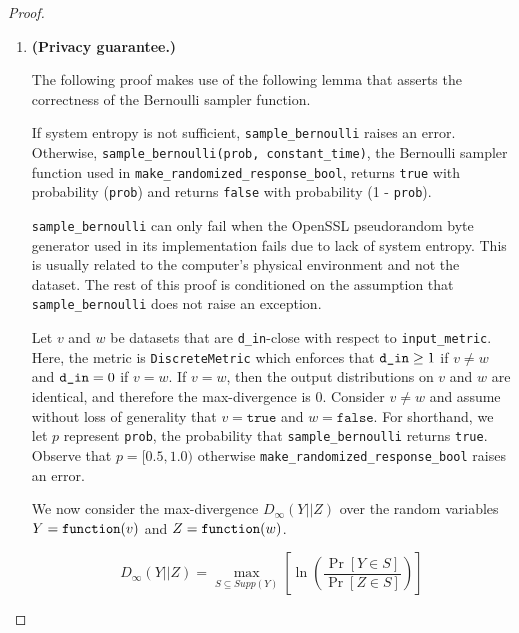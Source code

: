 \documentclass{article}
\begin{document}
\begin{proof} 
\hfill
\begin{enumerate}
    \item \textbf{(Privacy guarantee.)} 
    
    \begin{tcolorbox}
\begin{note}
The following proof makes use of the following lemma that asserts the correctness of the Bernoulli sampler function.
    \begin{lemma}
    If system entropy is not sufficient, \texttt{sample\_bernoulli} raises an error. 
    Otherwise, \texttt{sample\_bernoulli(prob, constant\_time)}, the Bernoulli sampler function used in \texttt{make\_randomized\_response\_bool}, 
    returns \texttt{true} with probability (\texttt{prob}) and returns  \texttt{false} with probability (1 - \texttt{prob}).
    \end{lemma}
\end{note}
\end{tcolorbox}

    \texttt{sample\_bernoulli} can only fail when the OpenSSL pseudorandom byte generator used in its implementation fails due to lack of system entropy. 
    This is usually related to the computer's physical environment and not the dataset. 
    The rest of this proof is conditioned on the assumption that \texttt{sample\_bernoulli} does not raise an exception. 
    
    Let $v$ and $w$ be datasets that are \texttt{d\_in}-close with respect to \texttt{input\_metric}.
    Here, the metric is \texttt{DiscreteMetric} which enforces that $\texttt{d\_in} \geq 1$ if $v \ne w$ and $\texttt{d\_in} = 0$ if $v = w$. 
    If $v = w$, then the output distributions on $v$ and $w$ are identical, and therefore the max-divergence is 0.
    Consider $v \ne w$ and assume without loss of generality that $v = \texttt{true}$ and $w = \texttt{false}$. 
    For shorthand, we let $p$ represent \texttt{prob}, the probability that \texttt{sample\_bernoulli} returns \texttt{true}. 
    Observe that $p = [0.5, 1.0)$ otherwise \texttt{make\_randomized\_response\_bool} raises an error. 
    
    We now consider the max-divergence $D_{\infty}(Y||Z)$ over the random variables $Y = \texttt{function}(v)$ and $Z = \texttt{function}(w)$.
    
    \[
    D_{\infty}(Y||Z) = \max_{S \subseteq Supp(Y)}\left[\ln (\frac{\Pr[Y \in S]}{\Pr[Z \in S]})\right] 
    \]
    

\end{enumerate}
\end{proof}
\end{document}
